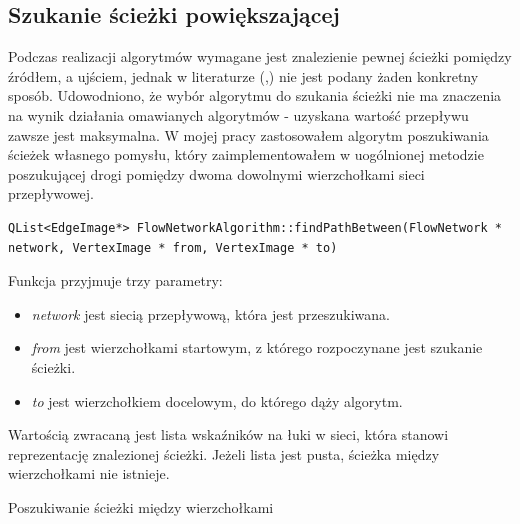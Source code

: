 \subsection{Szukanie ścieżki powiększającej}\label{ssec:szukanieSciezkiAlg}
Podczas realizacji algorytmów wymagane jest znalezienie pewnej ścieżki pomiędzy źródłem, a ujściem, jednak w literaturze (\cite{id:ZaawansowaneAlgorytmyStruktury},\cite{id:IntroductionToAlgorithms}) nie jest podany żaden konkretny sposób. Udowodniono, że wybór algorytmu do szukania ścieżki nie ma znaczenia na wynik działania omawianych algorytmów - uzyskana wartość przepływu zawsze jest maksymalna. W mojej pracy zastosowałem algorytm poszukiwania ścieżek własnego pomysłu, który zaimplementowałem w uogólnionej metodzie poszukującej drogi pomiędzy dwoma dowolnymi wierzchołkami sieci przepływowej.
\begin{verbatim}
QList<EdgeImage*> FlowNetworkAlgorithm::findPathBetween(FlowNetwork * network, VertexImage * from, VertexImage * to)
\end{verbatim}
Funkcja przyjmuje trzy parametry:
\begin{itemize}
	\item \emph{network} jest siecią przepływową, która jest przeszukiwana.
	\item \emph{from} jest wierzchołkami startowym, z którego rozpoczynane jest szukanie ścieżki.
	\item \emph{to} jest wierzchołkiem docelowym, do którego dąży algorytm.
\end{itemize}
Wartością zwracaną jest lista wskaźników na łuki w sieci, która stanowi reprezentację znalezionej ścieżki. Jeżeli lista jest pusta, ścieżka między wierzchołkami nie istnieje.
\begin{algorithm}[H]
	\caption{Poszukiwanie ścieżki między wierzchołkami}\label{poszukiwanieSciezkiMiedzyWierzcholkami}
	\begin{algorithmic}
					\EndIf
				\EndFor
					\Else
						\Else
						\EndIf
					\EndIf
				\EndIf
				\EndIf
			\EndWhile\space
		\EndProcedure
	\end{algorithmic}
\end{algorithm}
